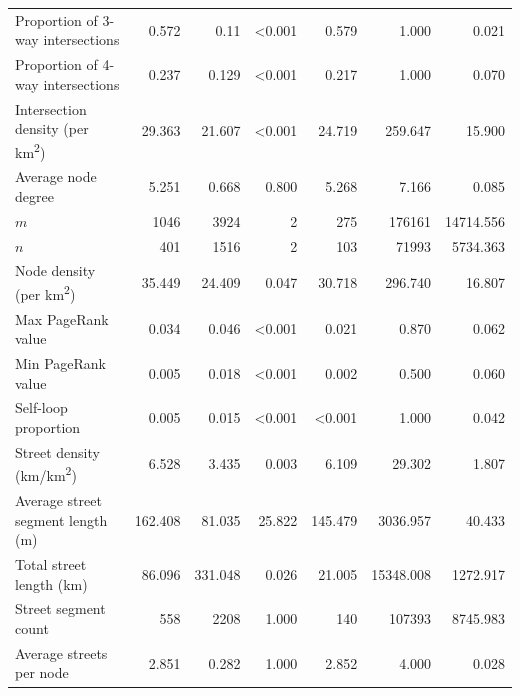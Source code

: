 \documentclass[11pt]{article}
\begin{document}
\begin{multicols}{2}
\begin{table}
\begin{tabular}{ l r r r r r r }
	Proportion of 3-way intersections                & 0.572   & 0.11    & \textless0.001 & 0.579          & 1.000     & 0.021    \\
	Proportion of 4-way intersections                & 0.237   & 0.129   & \textless0.001 & 0.217          & 1.000     & 0.070    \\
	Intersection density (per km\textsuperscript{2}) & 29.363  & 21.607  & \textless0.001 & 24.719         & 259.647   & 15.900   \\
	Average node degree                              & 5.251   & 0.668   & 0.800          & 5.268          & 7.166     & 0.085    \\
	$m$                                              & 1046    & 3924    & 2              & 275            & 176161    & 14714.556\\
	$n$                                              & 401     & 1516    & 2              & 103            & 71993     & 5734.363 \\
	Node density (per km\textsuperscript{2})         & 35.449  & 24.409  & 0.047          & 30.718         & 296.740   & 16.807   \\
	Max PageRank value                               & 0.034   & 0.046   & \textless0.001 & 0.021          & 0.870     & 0.062    \\
	Min PageRank value                               & 0.005   & 0.018   & \textless0.001 & 0.002          & 0.500     & 0.060    \\
	Self-loop proportion                             & 0.005   & 0.015   & \textless0.001 & \textless0.001 & 1.000     & 0.042    \\
	Street density (km/km\textsuperscript{2})        & 6.528   & 3.435   & 0.003          & 6.109          & 29.302    & 1.807    \\
	Average street segment length (m)                & 162.408 & 81.035  & 25.822         & 145.479        & 3036.957  & 40.433   \\
	Total street length (km)                         & 86.096  & 331.048 & 0.026          & 21.005         & 15348.008 & 1272.917 \\
	Street segment count                             & 558     & 2208    & 1.000          & 140            & 107393    & 8745.983 \\
	Average streets per node                         & 2.851   & 0.282   & 1.000          & 2.852          & 4.000     & 0.028    \\
	\bottomrule
\end{tabular}
\end{table}


\end{multicols}
\end{document}
